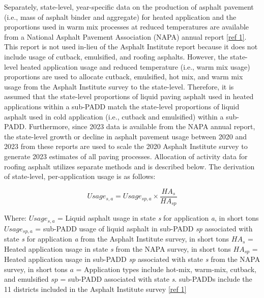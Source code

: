 \documentclass[
  11pt,
  oneside]{book}
\begin{document}
Separately, state-level, year-specific data on the production of asphalt pavement (i.e., mass of asphalt binder and aggregate) for heated application and the proportions used in warm mix processes at reduced temperatures are available from a National Asphalt Pavement Association (NAPA) annual report \hyperref[ref-1]{{[}ref 1{]}}. This report is not used in-lieu of the Asphalt Institute report because it does not include usage of cutback, emulsified, and roofing asphalts. However, the state-level heated application usage and reduced temperature (i.e., warm mix usage) proportions are used to allocate cutback, emulsified, hot mix, and warm mix usage from the Asphalt Institute survey to the state-level. Therefore, it is assumed that the state-level proportions of liquid paving asphalt used in heated applications within a sub-PADD match the state-level proportions of liquid asphalt used in cold application (i.e., cutback and emulsified) within a sub-PADD. Furthermore, since 2023 data is available from the NAPA annual report, the state-level growth or decline in asphalt pavement usage between 2020 and 2023 from these reports are used to scale the 2020 Asphalt Institute survey to generate 2023 estimates of all paving processes. Allocation of activity data for roofing asphalt utilizes separate methods and is described below. The derivation of state-level, per-application usage is as follows:

\begin{equation} 
  Usage_{s,a} = Usage_{sp,a} \times \frac{HA_{s}}{HA_{sp}}
  \label{eq:state-usage}
\end{equation}

Where: \newline
\(Usage_{s,a}\) = Liquid asphalt usage in state \emph{s} for application \emph{a}, in short tons \newline
\(Usage_{sp,a}\) = sub-PADD usage of liquid asphalt in sub-PADD \emph{sp} associated with state \emph{s} for application \emph{a} from the Asphalt Institute survey, in short tons \newline
\(HA_{s}\) = Heated application usage in state \emph{s} from the NAPA survey, in short tons \newline
\(HA_{sp}\) = Heated application usage in sub-PADD \emph{sp} associated with state \emph{s} from the NAPA survey, in short tons \newline
\(a\) = Application types include hot-mix, warm-mix, cutback, and emulsified \newline
\(sp\) = sub-PADD associated with state \emph{s}. sub-PADDs include the 11 districts included in the Asphalt Institute survey \hyperref[ref-1]{{[}ref 1{]}} \newline
\end{document}
